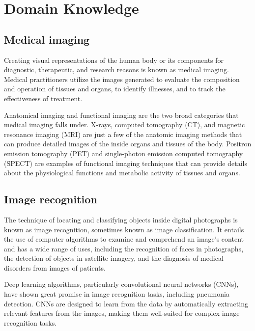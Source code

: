 %
%

\chapter{Domain Knowledge}


\section{Medical imaging}

Creating visual representations of the human body or its components for diagnostic, therapeutic, and research reasons is known as medical imaging. Medical practitioners utilize the images generated to evaluate the composition and operation of tissues and organs, to identify illnesses, and to track the effectiveness of treatment.

 \bigskip
 
Anatomical imaging and functional imaging are the two broad categories that medical imaging falls under. X-rays, computed tomography (CT), and magnetic resonance imaging (MRI) are just a few of the anatomic imaging methods that can produce detailed images of the inside organs and tissues of the body. Positron emission tomography (PET) and single-photon emission computed tomography (SPECT) are examples of functional imaging techniques that can provide details about the physiological functions and metabolic activity of tissues and organs. \autocite{Deserno:2011}

\section{Image recognition}

The technique of locating and classifying objects inside digital photographs is known as image recognition, sometimes known as image classification. It entails the use of computer algorithms to examine and comprehend an image's content and has a wide range of uses, including the recognition of faces in photographs, the detection of objects in satellite imagery, and the diagnosis of medical disorders from images of patients. \cite{Szeliski:2022}

\bigskip

Deep learning algorithms, particularly convolutional neural networks (CNNs), have shown great promise in image recognition tasks, including pneumonia detection. CNNs are designed to learn from the data by automatically extracting relevant features from the images, making them well-suited for complex image recognition tasks. \cite{Kermany:2018}

